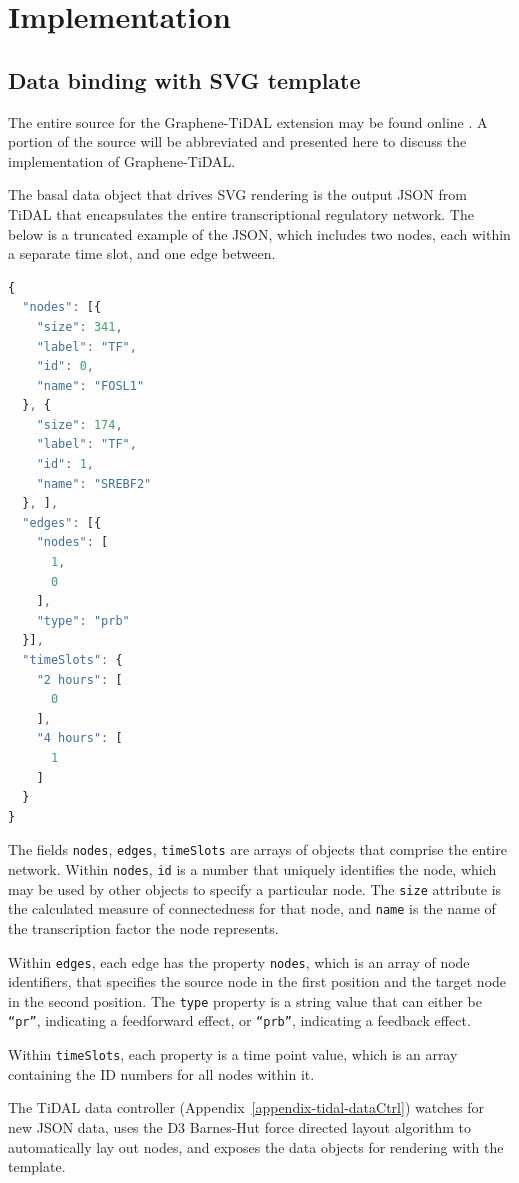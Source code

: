 \section{Implementation}
\subsection{Data binding with SVG template}

The entire source for the Graphene-TiDAL extension may be found online \autocite{gu2014grapheneTidal}.
A portion of the source will be abbreviated and presented here to discuss the implementation of Graphene-TiDAL.

The basal data object that drives SVG rendering is the output JSON from TiDAL that encapsulates the entire transcriptional regulatory network. 
The below is a truncated example of the JSON, which includes two nodes, each within a separate time slot, and one edge between.

\begin{lstlisting}[language=JavaScript]
{
  "nodes": [{
    "size": 341,
    "label": "TF",
    "id": 0,
    "name": "FOSL1"
  }, {
    "size": 174,
    "label": "TF",
    "id": 1,
    "name": "SREBF2"
  }, ],
  "edges": [{
    "nodes": [
      1,
      0
    ],
    "type": "prb"
  }],
  "timeSlots": {
    "2 hours": [
      0
    ],
    "4 hours": [
      1
    ]
  }
}
\end{lstlisting}

The fields \texttt{nodes}, \texttt{edges}, \texttt{timeSlots} are arrays of objects that comprise the entire network.
Within \texttt{nodes}, \texttt{id} is a number that uniquely identifies the node, which may be used by other objects to specify a particular node. 
The \texttt{size} attribute is the calculated measure of connectedness for that node, and \texttt{name} is the name of the transcription factor the node represents.

Within \texttt{edges}, each edge has the property \texttt{nodes}, which is an array of node identifiers, that specifies the source node in the first position and the target node in the second position.
The \texttt{type} property is a string value that can either be \texttt{“pr”}, indicating a feedforward effect, or \texttt{“prb”}, indicating a feedback effect.

Within \texttt{timeSlots}, each property is a time point value, which is an array containing the ID numbers for all nodes within it.

The TiDAL data controller (Appendix~\ref{appendix-tidal-dataCtrl}) watches for new JSON data, uses the D3 Barnes-Hut force directed layout algorithm to automatically lay out nodes, and exposes the data objects for rendering with the template.

